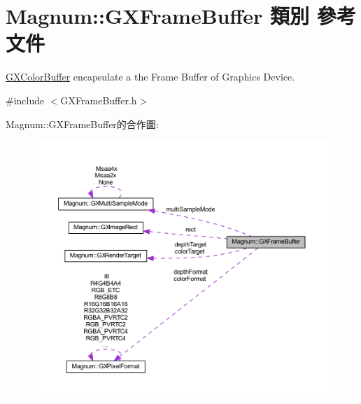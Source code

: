 \hypertarget{class_magnum_1_1_g_x_frame_buffer}{}\section{Magnum\+:\+:G\+X\+Frame\+Buffer 類別 參考文件}
\label{class_magnum_1_1_g_x_frame_buffer}


\hyperlink{class_magnum_1_1_g_x_color_buffer}{G\+X\+Color\+Buffer} encapsulate a the Frame Buffer of Graphics Device.  




{\ttfamily \#include $<$G\+X\+Frame\+Buffer.\+h$>$}



Magnum\+:\+:G\+X\+Frame\+Buffer的合作圖\+:\nopagebreak
\begin{figure}[H]
\begin{center}
\leavevmode
\includegraphics[width=350pt]{class_magnum_1_1_g_x_frame_buffer__coll__graph}
\end{center}
\end{figure}
